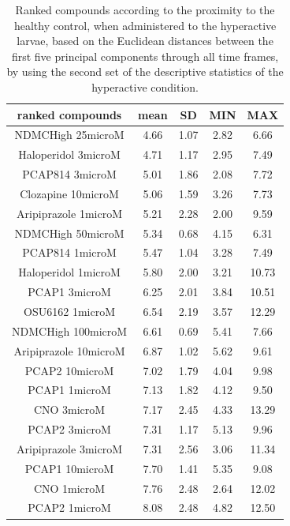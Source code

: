 \documentclass[a4paper,12pt]{article}
\begin{document}
\begin{table}[h!]\tiny
\centering
\caption{Ranked compounds according to the proximity to the healthy control, when administered to the hyperactive larvae, based on the Euclidean distances between the first five principal components through all time frames, by using the second set of the descriptive statistics of the hyperactive condition.}
\begin{tabular}{|c|c|c|c|c|}
\hline
ranked compounds             & mean & SD   & MIN  & MAX   \\ \hline
NDMCHigh 25microM     & 4.66  & 1.07  & 2.82 & 6.66  \\ \hline
Haloperidol 3microM   & 4.71  & 1.17  & 2.95 & 7.49  \\ \hline
PCAP814 3microM       & 5.01  & 1.86  & 2.08 & 7.72  \\ \hline
Clozapine 10microM    & 5.06  & 1.59  & 3.26 & 7.73  \\ \hline
Aripiprazole 1microM  & 5.21  & 2.28  & 2.00    & 9.59  \\ \hline
NDMCHigh 50microM     & 5.34  & 0.68  & 4.15 & 6.31  \\ \hline
PCAP814 1microM       & 5.47  & 1.04  & 3.28 & 7.49  \\ \hline
Haloperidol 1microM   & 5.80   & 2.00     & 3.21 & 10.73 \\ \hline
PCAP1 3microM         & 6.25  & 2.01  & 3.84 & 10.51 \\ \hline
OSU6162 1microM       & 6.54  & 2.19  & 3.57 & 12.29 \\ \hline
NDMCHigh 100microM    & 6.61  & 0.69  & 5.41 & 7.66  \\ \hline
Aripiprazole 10microM & 6.87  & 1.02  & 5.62 & 9.61  \\ \hline
PCAP2 10microM        & 7.02  & 1.79  & 4.04 & 9.98  \\ \hline
PCAP1 1microM         & 7.13  & 1.82  & 4.12 & 9.50   \\ \hline
CNO 3microM           & 7.17  & 2.45  & 4.33 & 13.29 \\ \hline
PCAP2 3microM         & 7.31  & 1.17  & 5.13 & 9.96  \\ \hline
Aripiprazole 3microM  & 7.31  & 2.56  & 3.06 & 11.34 \\ \hline
PCAP1 10microM        & 7.70   & 1.41  & 5.35 & 9.08  \\ \hline
CNO 1microM           & 7.76  & 2.48  & 2.64 & 12.02 \\ \hline
PCAP2 1microM         & 8.08  & 2.48  & 4.82 & 12.50  \\ \hline

\end{tabular}
\end{table}
\end{document}
